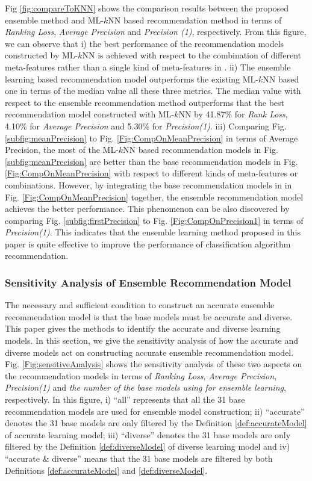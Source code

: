 \documentclass[prodmode,acmtkdd]{acmsmall}
\begin{document}
Fig \ref{fig:compareToKNN} shows the comparison results between the
proposed ensemble method and ML-$k$NN based recommendation method in
terms of \emph{Ranking Loss}, \emph{Average Precision} and
\emph{Precision (1)}, respectively. From this figure, we can observe
that i) the best performance of the recommendation models
constructed by ML-$k$NN is achieved with respect to the combination
of different meta-features rather than a single kind of
meta-features in \cite{wang2014generic}. ii) The ensemble learning
based recommendation model outperforms the existing ML-$k$NN based
one in terms of the median value all these three metrics. The median
value with respect to the ensemble recommendation method outperforms
that the best recommendation model constructed with ML-$k$NN by
41.87\% for \emph{Rank Loss}, 4.10\% for \emph{Average Precision}
and 5.30\% for \emph{Precision(1)}. iii) Comparing Fig.
\ref{subfig:meanPrecision} to Fig. \ref{Fig:CompOnMeanPrecision} in
terms of Average Precision, the most of the ML-$k$NN based
recommendation models in Fig. \ref{subfig:meanPrecision} are
better than the base recommendation models in Fig.
\ref{Fig:CompOnMeanPrecision} with respect to different kinds of
meta-features or combinations. However, by integrating the base
recommendation models in in Fig.
\ref{Fig:CompOnMeanPrecision} together, the ensemble recommendation model
achieves the better performance. This phenomenon can be also
discovered by comparing Fig. \ref{subfig:firstPrecision} to Fig.
\ref{Fig:CompOnPrecision1} in terms of \emph{Precision(1)}. This
indicates that the ensemble learning method proposed in this paper
is quite effective to improve the performance of classification
algorithm recommendation.


\subsubsection{Sensitivity Analysis of Ensemble Recommendation Model}

The necessary and sufficient condition to construct an accurate
ensemble recommendation model is that the base models must be
accurate and diverse. This paper gives the methods to identify the
accurate and diverse learning models. In this section, we give the
sensitivity analysis of how the accurate and diverse models act on
constructing accurate ensemble recommendation model. Fig.
\ref{Fig:sensitiveAnalysis} shows the sensitivity analysis of these
two aspects on the recommendation models in terms of \emph{Ranking
Loss}, \emph{Average Precision}, \emph{Precision(1)} and \emph{the
number of the base models using for ensemble learning},
respectively. In this figure, i) ``all'' represents that all the 31
base recommendation models are used for ensemble model construction;
ii) ``accurate'' denotes the 31 base models are only filtered by the
Definition \ref{def:accurateModel} of accurate learning model; iii)
``diverse'' denotes the 31 base models are only filtered by the
Definition \ref{def:diverseModel} of diverse learning model and iv)
``accurate \& diverse'' means that the 31 base models are filtered
by both Definitions \ref{def:accurateModel} and
\ref{def:diverseModel}.
\end{document}
